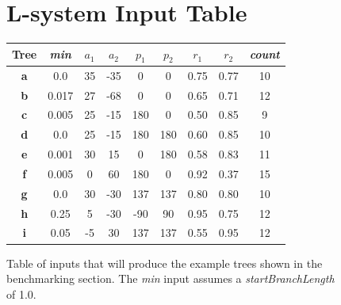 \documentclass[final]{cmpreport}
\begin{document}
\begin{figure}[ht]
    \section{L-system Input Table}
    \label{app:input-table}
    \begin{tabular}{||c c c c c c c c c||} 
        \hline
        \textbf{Tree} & \emph{min} & $a_1$ & $a_2$ & $p_1$ & $p_2$ & $r_1$ & $r_2$ & \emph{count}\\ [0.5ex] 
        \hline
        \textbf{a} & 0.0 & 35 & -35 & 0 & 0 & 0.75 & 0.77 & 10 \\ 
        \hline
        \textbf{b} & 0.017 & 27 & -68 & 0 & 0 & 0.65 & 0.71 & 12 \\ 
        \hline
        \textbf{c} & 0.005 & 25 & -15 & 180 & 0 & 0.50 & 0.85 & 9 \\ 
        \hline
        \textbf{d} & 0.0 & 25 & -15 & 180 & 180 & 0.60 & 0.85 & 10 \\ 
        \hline
        \textbf{e} & 0.001 & 30 & 15 & 0 & 180 & 0.58 & 0.83 & 11 \\ 
        \hline
        \textbf{f} & 0.005 & 0 & 60 & 180 & 0 & 0.92 & 0.37 & 15 \\ 
        \hline
        \textbf{g} & 0.0 & 30 & -30 & 137 & 137 & 0.80 & 0.80 & 10 \\ 
        \hline
        \textbf{h} & 0.25 & 5 & -30 & -90 & 90 & 0.95 & 0.75 & 12 \\ 
        \hline
        \textbf{i} & 0.05 & -5 & 30 & 137 & 137 & 0.55 & 0.95 & 12 \\ [0.5ex]
        \hline
    \end{tabular}
    \centering
    \captionsetup{justification=centering}
    \caption{Table of inputs that will produce the example trees shown in the benchmarking section. 
             The \emph{min} input assumes a \emph{startBranchLength} of 1.0.}
\end{figure}
\end{document}
